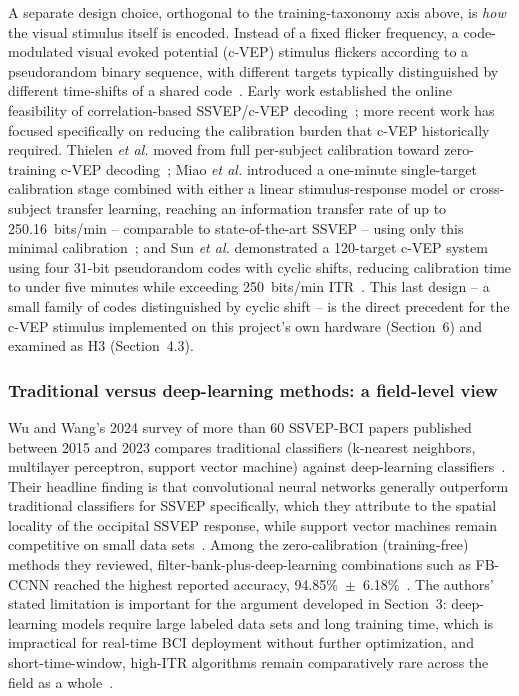 \documentclass[11pt]{article}
\begin{document}
A separate design choice, orthogonal to the training-taxonomy axis above, is \emph{how} the visual stimulus itself is encoded. Instead of a fixed flicker frequency, a code-modulated visual evoked potential (c-VEP) stimulus flickers according to a pseudorandom binary sequence, with different targets typically distinguished by different time-shifts of a shared code~\cite{martinezcagigal2021cvepreview}. Early work established the online feasibility of correlation-based SSVEP/c-VEP decoding~\cite{bin2009online}; more recent work has focused specifically on reducing the calibration burden that c-VEP historically required. Thielen \textit{et al.} moved from full per-subject calibration toward zero-training c-VEP decoding~\cite{thielen2021zerotraining}; Miao \textit{et al.} introduced a one-minute single-target calibration stage combined with either a linear stimulus-response model or cross-subject transfer learning, reaching an information transfer rate of up to 250.16~bits/min -- comparable to state-of-the-art SSVEP -- using only this minimal calibration~\cite{miao2024cvepminimal}; and Sun \textit{et al.} demonstrated a 120-target c-VEP system using four 31-bit pseudorandom codes with cyclic shifts, reducing calibration time to under five minutes while exceeding 250~bits/min ITR~\cite{sun2022cyclicshift}. This last design -- a small family of codes distinguished by cyclic shift -- is the direct precedent for the c-VEP stimulus implemented on this project's own hardware (Section~6) and examined as H3 (Section~4.3).

\subsubsection{Traditional versus deep-learning methods: a field-level view}

Wu and Wang's 2024 survey of more than 60 SSVEP-BCI papers published between 2015 and 2023 compares traditional classifiers (k-nearest neighbors, multilayer perceptron, support vector machine) against deep-learning classifiers~\cite{wu2024analysis}. Their headline finding is that convolutional neural networks generally outperform traditional classifiers for SSVEP specifically, which they attribute to the spatial locality of the occipital SSVEP response, while support vector machines remain competitive on small data sets~\cite{wu2024analysis}. Among the zero-calibration (training-free) methods they reviewed, filter-bank-plus-deep-learning combinations such as FB-CCNN reached the highest reported accuracy, 94.85\%~$\pm$~6.18\%~\cite{wu2024analysis}. The authors' stated limitation is important for the argument developed in Section~3: deep-learning models require large labeled data sets and long training time, which is impractical for real-time BCI deployment without further optimization, and short-time-window, high-ITR algorithms remain comparatively rare across the field as a whole~\cite{wu2024analysis}.
\end{document}
